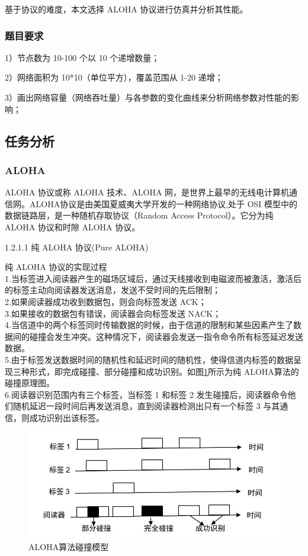\documentclass{article}
\begin{document}
	基于协议的难度，本文选择 ALOHA 协议进行仿真并分析其性能。
	
	\subsubsection{题目要求}
	1）节点数为 10-100 个以 10 个递增数量；\par
	2）网络面积为 10*10（单位平方），覆盖范围从 1-20 递增；\par
	3）画出网络容量（网络吞吐量）与各参数的变化曲线来分析网络参数对性能的影响；
	
	\subsection{任务分析}
	\subsubsection{ALOHA}
	ALOHA 协议或称 ALOHA 技术、ALOHA 网，是世界上最早的无线电计算机通信网。ALOHA协议是由美国夏威夷大学开发的一种网络协议,处于 OSI 模型中的数据链路层，是一种随机存取协议（Random Access Protocol）。它分为纯 ALOHA 协议和时隙 ALOHA 协议。
	\\ 	\par
	1.2.1.1 纯 ALOHA 协议(Pure ALOHA)\\
	\par
	纯 ALOHA 协议的实现过程\\
	1.当标签进入阅读器产生的磁场区域后，通过天线接收到电磁波而被激活，激活后的标签主动向阅读器发送消息，发送不受时间的先后限制；\\
	2.如果阅读器成功收到数据包，则会向标签发送 ACK；\\
	3.如果接收的数据包有错误，阅读器会向标签发送 NACK；\\
	4.当信道中的两个标签同时传输数据的时候，由于信道的限制和某些因素产生了数据间的碰撞会发生冲突。这种情况下，阅读器会发送一指令命令所有标签延迟发送数据。\\
	5.由于标签发送数据时间的随机性和延迟时间的随机性，使得信道内标签的数据呈现三种形式，即完成碰撞、部分碰撞和成功识别。如图\ref{fig-2}所示为纯 ALOHA算法的碰撞原理图。\\
	6.阅读器识别范围内有三个标签，当标签 1  和标签 2 发生碰撞后，阅读器命令他们随机延迟一段时间后再发送消息，直到阅读器检测出只有一个标签 3 与其通信，则成功识别出该标签。
	
	\begin{figure}[htbp]
		\centering
		\includegraphics[scale=0.5]{2}
		\caption{ALOHA算法碰撞模型}
		\label{fig-2}
	\end{figure}
	
\end{document}
